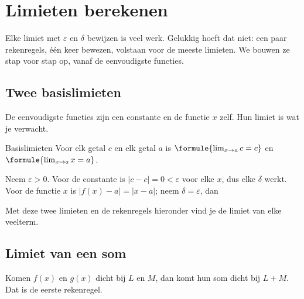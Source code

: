 \begin{oefeningen}
\end{oefeningen}

\section{Limieten berekenen}

Elke limiet met $\varepsilon$ en $\delta$ bewijzen is veel werk. Gelukkig hoeft dat niet: een paar rekenregels, één keer bewezen, volstaan voor de meeste limieten. We bouwen ze stap voor stap op, vanaf de eenvoudigste functies.

\subsection{Twee basislimieten}

De eenvoudigste functies zijn een constante en de functie $x$ zelf. Hun limiet is wat je verwacht.

\begin{theorie}
\begin{stelling}{Basislimieten}
Voor elk getal $c$ en elk getal $a$ is \quad $\formule{\lim_{x \to a} c = c}$ \quad en \quad $\formule{\lim_{x \to a} x = a}$.
\end{stelling}
\begin{bewijs}
Neem $\varepsilon > 0$. Voor de constante is $|c - c| = 0 < \varepsilon$ voor elke $x$, dus elke $\delta$ werkt. Voor de functie $x$ is $|f(x) - a| = |x - a|$; neem $\delta = \varepsilon$, dan
\end{bewijs}
\end{theorie}

Met deze twee limieten en de rekenregels hieronder vind je de limiet van elke veelterm.

\subsection{Limiet van een som}

Komen $f(x)$ en $g(x)$ dicht bij $L$ en $M$, dan komt hun som dicht bij $L + M$. Dat is de eerste rekenregel.

